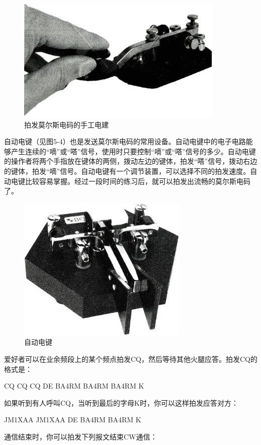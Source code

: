 \documentclass[12pt,UTF8]{ctexbook}
\begin{document}
\begin{figure}[htbp]
	\centering
	\includegraphics[width=0.7\linewidth]{67}
	\caption{拍发莫尔斯电码的手工电建}
	\label{fig:1}
\end{figure}

自动电键（见图5-4）也是发送莫尔斯电码的常用设备。自动电键中的电子电路能够产生连续的“嘀”或“嗒”信号，使用时只要控制“嘀”或“嗒”信号的多少。自动电键的操作者将两个手指放在键体的两侧，拨动左边的键体，拍发“嗒”信号，拨动右边的键体，拍发“嘀”信号。自动电键有一个调节装置，可以选择不同的拍发速度。自动电键比较容易掌握。经过一段时间的练习后，就可以拍发出流畅的莫尔斯电码了。

\begin{figure}[htbp]
	\centering
	\includegraphics[width=0.7\linewidth]{68}
	\caption{自动电键}
	\label{fig:1}
\end{figure}

爱好者可以在业余频段上的某个频点拍发CQ，然后等待其他火腿应答。拍发CQ的格式是：

CQ CQ CQ DE BA4RM BA4RM BA4RM K

如果听到有人呼叫CQ，当听到最后的字母K时，你可以这样拍发应答对方：

JM1XAA JM1XAA DE BA4RM BA4RM K

通信结束时，你可以拍发下列报文结束CW通信：
\end{document}
